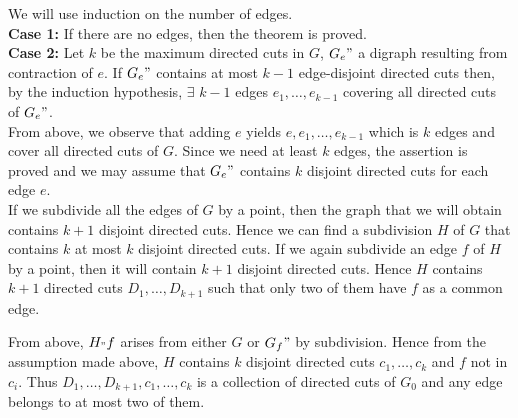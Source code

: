 \documentclass[8pt]{beamer}
\begin{document}
\begin{frame}
We will use induction on the number of edges. \\
\textbf{Case 1:} If there are no edges, then the theorem is proved. \\
\textbf{Case 2:} Let $k$ be the maximum directed cuts in $G$, $G_e"$ a digraph resulting from contraction of $e$. If $G_e"$ contains at most $k-1$ edge-disjoint directed cuts then, by the induction hypothesis, $\exists$ $k-1$ edges $e_1,\dots,e_{k-1}$ covering all directed cuts of $G_e"$. \\
From above, we observe that adding $e$ yields $e, e_1,\dots,e_{k-1}$ which is $k$ edges and cover all directed cuts of $G$. Since we need at least $k$ edges, the assertion is proved and we may assume that $G_e"$ contains $k$ disjoint directed cuts for each edge $e$.\\

If we subdivide all the edges of $G$ by a point, then the graph that we will obtain contains $k+1$ disjoint directed cuts. Hence we can find a subdivision $H$ of $G$ that contains $k$ at most $k$ disjoint directed cuts. If we again subdivide an edge $f$ of $H$ by a point, then it will contain $k+1$ disjoint directed cuts. Hence $H$ contains $k+1$ directed cuts $D_1,\dots,D_{k+1}$ such that only two of them have $f$ as a common edge. 

From above, $H_"f$ arises from either $G$ or $G_f"$ by subdivision. Hence from the assumption made above, $H$ contains $k$ disjoint directed cuts $c_1,\dots,c_k$ and $f$ not in $c_i$. Thus $D_1,\dots,D_{k+1},c_1,\dots,c_k$ is a collection of directed cuts of $G_0$ and any edge belongs to at most two of them. 

\end{frame}
\end{document}
